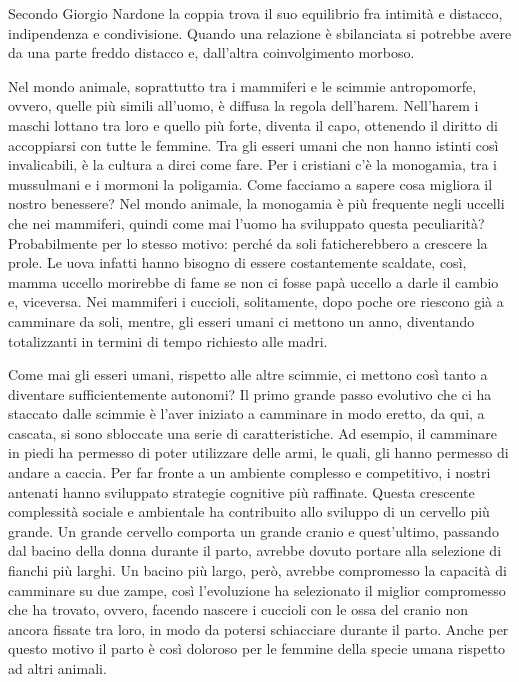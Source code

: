 \documentclass[12pt]{book} %
\begin{document}
Secondo Giorgio Nardone la coppia trova il suo equilibrio fra intimità e distacco, indipendenza e condivisione. Quando una relazione è sbilanciata si potrebbe avere da una parte freddo distacco e, dall'altra coinvolgimento morboso.

Nel mondo animale, soprattutto tra i mammiferi e le scimmie antropomorfe, ovvero, quelle più simili all'uomo, è diffusa la regola dell'harem. Nell'harem i
maschi lottano tra loro e quello più forte, diventa il capo, ottenendo il diritto di accoppiarsi con tutte le femmine. Tra gli esseri umani che non hanno istinti così invalicabili, è la cultura a dirci come fare. Per i cristiani c'è la monogamia, tra i mussulmani e i mormoni la poligamia. Come facciamo a sapere cosa migliora il nostro benessere? Nel mondo animale, la monogamia è più frequente negli uccelli che nei mammiferi, quindi come mai l'uomo ha sviluppato questa peculiarità? Probabilmente per lo stesso motivo: perché da soli faticherebbero a crescere la prole. Le uova infatti hanno bisogno di essere costantemente scaldate, così, mamma uccello morirebbe di fame se non ci fosse papà uccello a darle il cambio e, viceversa. Nei mammiferi i cuccioli, solitamente, dopo poche ore riescono già a camminare da soli, mentre, gli esseri umani ci mettono un anno, diventando totalizzanti in termini di tempo richiesto alle madri. 

Come mai gli esseri umani, rispetto alle altre scimmie, ci mettono così tanto a diventare sufficientemente autonomi? Il primo grande passo evolutivo che ci ha staccato dalle scimmie è l'aver iniziato a camminare in modo eretto, da qui, a cascata, si sono sbloccate una serie di caratteristiche. 
Ad esempio, il camminare in piedi ha permesso di poter utilizzare delle armi, le quali, gli hanno permesso di andare a caccia. Per far fronte a un ambiente complesso e competitivo, i nostri antenati hanno sviluppato strategie cognitive più raffinate. Questa crescente complessità sociale e ambientale ha contribuito allo sviluppo di un cervello più grande. Un grande cervello comporta un grande cranio e quest'ultimo, passando dal bacino della donna durante il parto, avrebbe dovuto portare alla selezione di fianchi più larghi. Un bacino più largo, però, avrebbe compromesso la capacità di camminare su due zampe,
così l'evoluzione ha selezionato il miglior compromesso che ha trovato, ovvero, facendo nascere i cuccioli con le ossa del cranio non ancora fissate tra loro, in modo da potersi schiacciare durante il parto. Anche per questo motivo il parto è così doloroso per le femmine della specie umana rispetto ad altri animali.
\end{document}
